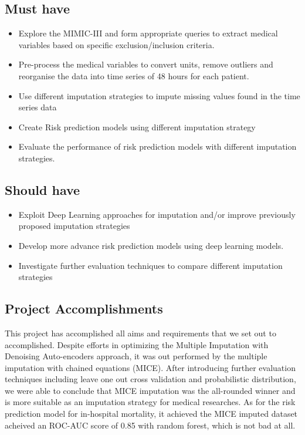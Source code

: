 \documentclass{l4proj}
\begin{document}
\subsection{Must have}
\begin{itemize}
  \item Explore the MIMIC-III and form appropriate queries to extract medical variables based on specific exclusion/inclusion criteria.
  \item Pre-process the medical variables to convert units, remove outliers and reorganise the data into time series of 48 hours for each patient.
  \item Use different imputation strategies to impute missing values found in the time series data
  \item Create Risk prediction models using different imputation strategy
  \item Evaluate the performance of risk prediction models with different imputation strategies.

\end{itemize}

\subsection{Should have}

\begin{itemize}
  \item Exploit Deep Learning approaches for imputation and/or improve previously proposed imputation strategies
  \item Develop more advance risk prediction models using deep learning models.
  \item Investigate further evaluation techniques to compare different imputation strategies

\end{itemize}

\subsection{Project Accomplishments}
This project has accomplished all aims and requirements that we set out to accomplished. Despite efforts in optimizing the Multiple Imputation with Denoising Auto-encoders approach, it was out performed by the multiple imputation with chained equations (MICE). After introducing further evaluation techniques including leave one out cross validation and probabilistic distribution, we were able to conclude that MICE imputation was the all-rounded winner and is more suitable as an imputation strategy for medical researches. As for the risk prediction model for in-hospital mortality, it achieved the MICE imputed dataset acheived an ROC-AUC score of 0.85 with random forest, which is not bad at all. 
\end{document}
